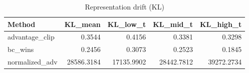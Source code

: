 \begin{table}[htbp]
\centering
\caption{Representation drift (KL)}
\label{tab:repr-drift}
\begin{tabular}{lrrrr}
\toprule
\textbf{Method} & \textbf{KL\_mean} & \textbf{KL\_low\_t} & \textbf{KL\_mid\_t} & \textbf{KL\_high\_t} \\
\midrule
advantage\_clip & 0.3544 & 0.4156 & 0.3381 & 0.3298 \\
bc\_wins & 0.2456 & 0.3073 & 0.2523 & 0.1845 \\
normalized\_adv & 28586.3184 & 17135.9902 & 28442.7812 & 39272.2734 \\
\bottomrule
\end{tabular}
\end{table}